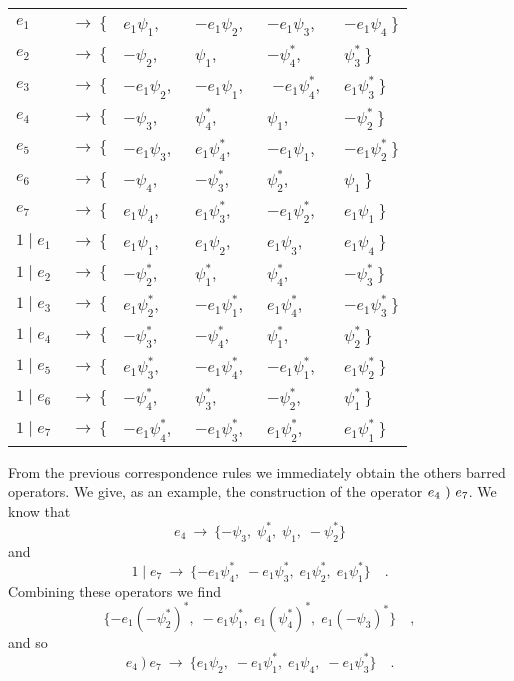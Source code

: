 \documentclass[a4paper,12pt]{book}
\begin{document}
\begin{center}
\begin{tabular}{llllll}
${e_{1}}$ & $~\rightarrow ~\{$ & $e_{1}\psi _{1}$, & ~$-e_{1}\psi _{2}$, & ~$%
-e_{1}\psi _{3}$, & ~$-e_{1}\psi _{4}~\}$ \\ 
${e_{2}}$ & $~\rightarrow ~\{$ & $-\psi _{2}$, & ~$\psi _{1}$, & ~$-\psi
_{4}^{*}$, & ~$\psi _{3}^{*}~\}$ \\ 
${e_{3}}$ & $~\rightarrow ~\{$ & $-e_{1}\psi _{2}$, & ~$-e_{1}\psi _{1}$, & ~%
$-e_{1}\psi _{4}^{*}$, & ~$e_{1}\psi _{3}^{*}~\}$ \\ 
${e_{4}}$ & $~\rightarrow ~\{$ & $-\psi _{3}$, & ~$\psi _{4}^{*}$, & ~$\psi
_{1}$, & ~$-\psi _{2}^{*}~\}$ \\ 
${e_{5}}$ & $~\rightarrow ~\{$ & $-e_{1}\psi _{3}$, & ~$e_{1}\psi _{4}^{*}$,
& ~$-e_{1}\psi _{1}$, & ~$-e_{1}\psi _{2}^{*}~\}$ \\ 
${e_{6}}$ & $~\rightarrow ~\{$ & $-\psi _{4}$, & ~$-\psi _{3}^{*}$, & ~$\psi
_{2}^{*}$, & ~$\psi _{1}~\}$ \\ 
${e_{7}}$ & $~\rightarrow ~\{$ & $e_{1}\psi _{4}$, & ~$e_{1}\psi _{3}^{*}$,
& ~$-e_{1}\psi _{2}^{*}$, & ~$e_{1}\psi _{1}~\}$ \\ 
${1\mid e_{1}}$ & $~\rightarrow ~\{$ & $e_{1}\psi _{1}$, & ~$e_{1}\psi _{2}$,
& ~$e_{1}\psi _{3}$, & ~$e_{1}\psi _{4}~\}$ \\ 
${1\mid e_{2}}$ & $~\rightarrow ~\{$ & $-\psi _{2}^{*}$, & ~$\psi _{1}^{*}$,
& ~$\psi _{4}^{*}$, & ~$-\psi _{3}^{*}~\}$ \\ 
${1\mid e_{3}}$ & $~\rightarrow ~\{$ & $e_{1}\psi _{2}^{*}$, & ~$-e_{1}\psi
_{1}^{*}$, & ~$e_{1}\psi _{4}^{*}$, & ~$-e_{1}\psi _{3}^{*}~\}$ \\ 
${1\mid e_{4}}$ & $~\rightarrow ~\{$ & $-\psi _{3}^{*}$, & ~$-\psi _{4}^{*}$,
& ~$\psi _{1}^{*}$, & ~$\psi _{2}^{*}~\}$ \\ 
${1\mid e_{5}}$ & $~\rightarrow ~\{$ & $e_{1}\psi _{3}^{*}$, & ~$-e_{1}\psi
_{4}^{*}$, & ~$-e_{1}\psi _{1}^{*}$, & ~$e_{1}\psi _{2}^{*}~\}$ \\ 
${1\mid e_{6}}$ & $~\rightarrow ~\{$ & $-\psi _{4}^{*}$, & ~$\psi _{3}^{*}$,
& ~$-\psi _{2}^{*}$, & ~$\psi _{1}^{*}~\}$ \\ 
${1\mid e_{7}}$ & $~\rightarrow ~\{$ & $-e_{1}\psi _{4}^{*}$, & ~$-e_{1}\psi
_{3}^{*}$, & ~$e_{1}\psi _{2}^{*}$, & ~$e_{1}\psi _{1}^{*}~\}$%
\end{tabular}
\end{center}

From the previous correspondence rules we immediately obtain the others
barred operators. We give, as an example, the construction of the operator ${%
e_{4}~)~e_{7}}$. We know that 
\[
{e_{4}}~\rightarrow ~\{-\psi _{3},\;\psi _{4}^{*},\;\psi _{1},\;-\psi
_{2}^{*}\} 
\]
and 
\begin{equation}
{1\mid e_{7}}~\rightarrow ~\{-e_{1}\psi _{4}^{*},\;-e_{1}\psi
_{3}^{*},\;e_{1}\psi _{2}^{*},\;e_{1}\psi _{1}^{*}\}\quad .
\end{equation}
Combining these operators we find 
\[
\{-e_{1}(-\psi _{2}^{*})^{*},\;-e_{1}\psi _{1}^{*},\;e_{1}(\psi
_{4}^{*})^{*},\;e_{1}(-\psi _{3})^{*}\}\quad , 
\]
and so 
\[
{e_{4}~)~e_{7}}~\rightarrow ~\{e_{1}\psi _{2},\;-e_{1}\psi
_{1}^{*},\;e_{1}\psi _{4},\;-e_{1}\psi _{3}^{*}\}\quad . 
\]
\end{document}
